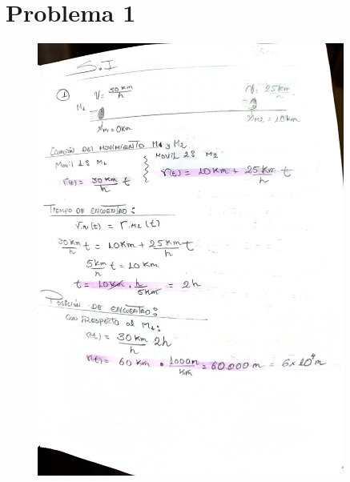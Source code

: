 \documentclass{article}
\begin{document}







\section{Problema 1}

\begin{figure}[ht!]
  \centering
  \includegraphics[width=0.9\textwidth]{assets/11.jpg}
  \label{fig:example_image1}
\end{figure}
\end{document}
